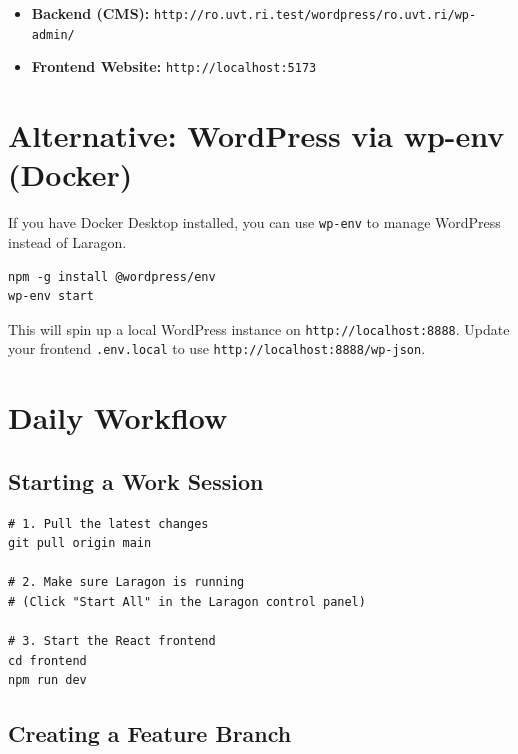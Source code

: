 \documentclass[11pt,a4paper]{article}
\begin{document}
\begin{itemize}[leftmargin=1.5em]
    \item \textbf{Backend (CMS):} \texttt{http://ro.uvt.ri.test/wordpress/ro.uvt.ri/wp-admin/}
    \item \textbf{Frontend Website:} \texttt{http://localhost:5173}
\end{itemize}

\section{Alternative: WordPress via wp-env (Docker)}
\label{sec:alt-wp}

If you have Docker Desktop installed, you can use \texttt{wp-env} to manage WordPress instead of Laragon.

\begin{lstlisting}
npm -g install @wordpress/env
wp-env start
\end{lstlisting}

This will spin up a local WordPress instance on \texttt{http://localhost:8888}. Update your frontend \texttt{.env.local} to use \texttt{http://localhost:8888/wp-json}.

\section{Daily Workflow}

\subsection{Starting a Work Session}

\begin{lstlisting}
# 1. Pull the latest changes
git pull origin main

# 2. Make sure Laragon is running
# (Click "Start All" in the Laragon control panel)

# 3. Start the React frontend
cd frontend
npm run dev
\end{lstlisting}

\subsection{Creating a Feature Branch}
\end{document}
